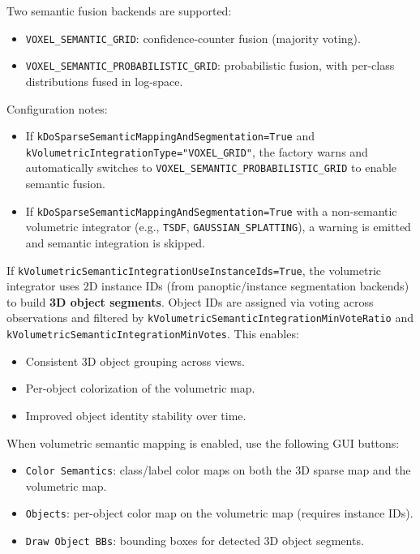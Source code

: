 \documentclass{article}
\begin{document}
Two semantic fusion backends are supported:
\begin{itemize}
\item \texttt{VOXEL\_SEMANTIC\_GRID}: confidence-counter fusion (majority voting).
\item \texttt{VOXEL\_SEMANTIC\_PROBABILISTIC\_GRID}: probabilistic fusion, with per-class distributions fused in log-space.
\end{itemize}

Configuration notes:
\begin{itemize}
\item If \texttt{kDoSparseSemanticMappingAndSegmentation=True} and \texttt{kVolumetricIntegrationType="VOXEL\_GRID"}, the factory warns and automatically switches to \texttt{VOXEL\_SEMANTIC\_PROBABILISTIC\_GRID} to enable semantic fusion.
\item If \texttt{kDoSparseSemanticMappingAndSegmentation=True} with a non-semantic volumetric integrator (e.g., \texttt{TSDF}, \texttt{GAUSSIAN\_SPLATTING}), a warning is emitted and semantic integration is skipped.
\end{itemize}

If \texttt{kVolumetricSemanticIntegrationUseInstanceIds=True}, the volumetric integrator uses 2D instance IDs (from panoptic/instance segmentation backends) to build \textbf{3D object segments}. Object IDs are assigned via voting across observations and filtered by \texttt{kVolumetricSemanticIntegrationMinVoteRatio} and \texttt{kVolumetricSemanticIntegrationMinVotes}. This enables:
\begin{itemize}
\item Consistent 3D object grouping across views.
\item Per-object colorization of the volumetric map.
\item Improved object identity stability over time.
\end{itemize}

When volumetric semantic mapping is enabled, use the following GUI buttons:
\begin{itemize}
\item \texttt{Color Semantics}: class/label color maps on both the 3D sparse map and the volumetric map.
\item \texttt{Objects}: per-object color map on the volumetric map (requires instance IDs).
\item \texttt{Draw Object BBs}: bounding boxes for detected 3D object segments.
\end{itemize}
\end{document}
